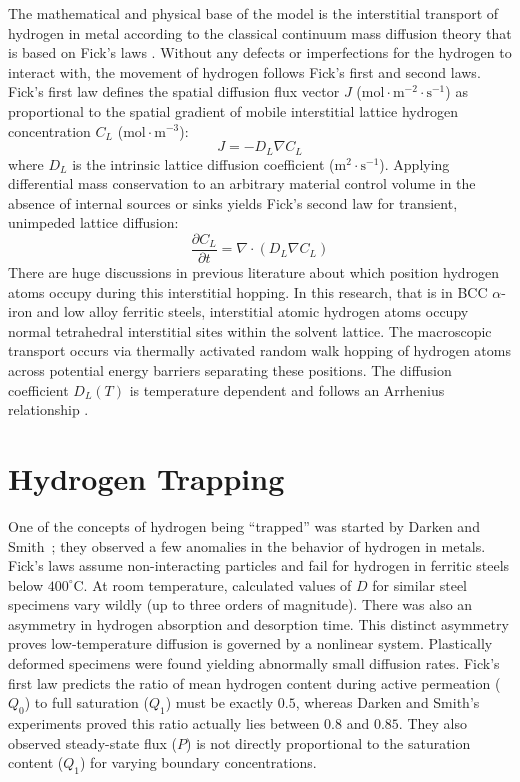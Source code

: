 \documentclass[a4paper,12pt,oneside]{report}
\begin{document}
The mathematical and physical base of the model is the interstitial transport of hydrogen in metal according to the classical continuum mass diffusion theory that is based on Fick's laws \cite{Darken1949}\cite{Fallahmohammadi2013}\cite{Legrand2015}. Without any defects or imperfections for the hydrogen to interact with, the movement of hydrogen follows Fick's first and second laws. Fick's first law defines the spatial diffusion flux vector $J$ ($\text{mol} \cdot \text{m}^{-2} \cdot \text{s}^{-1}$) as proportional to the spatial gradient of mobile interstitial lattice hydrogen concentration $C_L$ ($\text{mol} \cdot \text{m}^{-3}$)\cite{Fallahmohammadi2013}\cite{Legrand2015}:
\begin{equation}
    J = -D_L \nabla C_L
\end{equation}
where $D_L$ is the intrinsic lattice diffusion coefficient ($\text{m}^2 \cdot \text{s}^{-1}$)\cite{Fallahmohammadi2013}. Applying differential mass conservation to an arbitrary material control volume in the absence of internal sources or sinks yields Fick's second law for transient, unimpeded lattice diffusion\cite{Fallahmohammadi2013}\cite{Legrand2015}:
\begin{equation}
    \frac{\partial C_L}{\partial t} = \nabla \cdot (D_L \nabla C_L)
\end{equation}
There are huge discussions in previous literature about which position hydrogen atoms occupy during this interstitial hopping. In this research, that is in BCC $\alpha$-iron and low alloy ferritic steels, interstitial atomic hydrogen atoms occupy normal tetrahedral interstitial sites within the solvent lattice\cite{Chen2025}. The macroscopic transport occurs via thermally activated random walk hopping of hydrogen atoms across potential energy barriers separating these positions. The diffusion coefficient $D_L(T)$ is temperature dependent and follows an Arrhenius relationship \cite{Legrand2015}\cite{Turnbull1997}\cite{Diaz2020}.

\section{Hydrogen Trapping}
\label{sec:hydrogen_trapping}

One of the concepts of hydrogen being ``trapped'' was started by Darken and Smith~\cite{Darken1949}; they observed a few anomalies in the behavior of hydrogen in metals. Fick's laws assume non-interacting particles and fail for hydrogen in ferritic steels below $400^\circ\text{C}$. At room temperature, calculated values of $D$ for similar steel specimens vary wildly (up to three orders of magnitude). There was also an asymmetry in hydrogen absorption and desorption time. This distinct asymmetry proves low-temperature diffusion is governed by a nonlinear system. Plastically deformed specimens were found yielding abnormally small diffusion rates. Fick's first law predicts the ratio of mean hydrogen content during active permeation ($Q_0$) to full saturation ($Q_1$) must be exactly $0.5$, whereas Darken and Smith's experiments proved this ratio actually lies between $0.8$ and $0.85$. They also observed steady-state flux ($P$) is not directly proportional to the saturation content ($Q_1$) for varying boundary concentrations.
\end{document}
